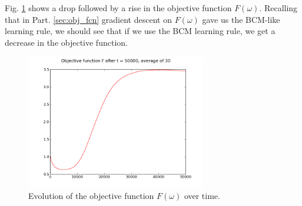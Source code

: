 Fig. \ref{fig:obj_over_time} shows a drop followed by a rise in the objective function $F(\omega)$. Recalling that in Part. \ref{sec:obj_fcn} gradient descent on $F(\omega)$ gave us the BCM-like learning rule, we should see that if we use the BCM learning rule, we get a decrease in the objective function. 
\begin{figure}[h]
\centering
\includegraphics[width=0.7\textwidth]{../ex2/obj_t50000_mean_results.png}
\caption{Evolution of the objective function $F(\omega)$ over time.}
\label{fig:obj_over_time}
\end{figure}

